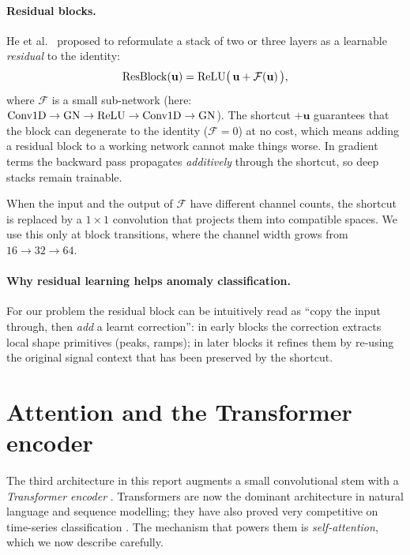 \paragraph{Residual blocks.}
He et al.\ \cite{he2016deep} proposed to reformulate a stack of two or
three layers as a learnable \emph{residual} to the identity:
\begin{equation}
    \mathrm{ResBlock}(\mathbf{u}) = \operatorname{ReLU}\bigl(\, \mathbf{u} + \mathcal{F}(\mathbf{u}) \,\bigr),
    \label{eq:resblock}
\end{equation}
where $\mathcal{F}$ is a small sub-network (here: $\operatorname{Conv1D} \to \operatorname{GN} \to
\operatorname{ReLU} \to \operatorname{Conv1D} \to \operatorname{GN}$). The shortcut $+\mathbf{u}$ guarantees that
the block can degenerate to the identity ($\mathcal{F}=0$) at no cost,
which means adding a residual block to a working network cannot make
things worse. In gradient terms the backward pass propagates
\emph{additively} through the shortcut, so deep stacks remain
trainable.

When the input and the output of $\mathcal{F}$ have different channel
counts, the shortcut is replaced by a $1{\times}1$ convolution that
projects them into compatible spaces. We use this only at block
transitions, where the channel width grows from $16 \to 32 \to 64$.

\paragraph{Why residual learning helps anomaly classification.}
For our problem the residual block can be intuitively read as ``copy
the input through, then \emph{add} a learnt correction'': in early
blocks the correction extracts local shape primitives (peaks, ramps);
in later blocks it refines them by re-using the original signal context
that has been preserved by the shortcut.

\section{Attention and the Transformer encoder}
\label{sec:attention-theory}

The third architecture in this report augments a small convolutional
stem with a \emph{Transformer encoder} \cite{vaswani2017attention}.
Transformers are now the dominant architecture in natural language and
sequence modelling; they have also proved very competitive on
time-series classification \cite{hu2022eeg}. The mechanism that powers
them is \emph{self-attention}, which we now describe carefully.

